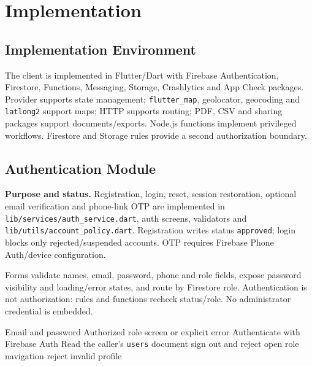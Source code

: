 \chapter{Implementation}\label{ch:implementation}
\section{Implementation Environment}
The client is implemented in Flutter/Dart with Firebase Authentication, Firestore, Functions, Messaging, Storage, Crashlytics and App Check packages. Provider supports state management; \texttt{flutter\_map}, geolocator, geocoding and \texttt{latlong2} support maps; HTTP supports routing; PDF, CSV and sharing packages support documents/exports. Node.js functions implement privileged workflows. Firestore and Storage rules provide a second authorization boundary.

\section{Authentication Module}
\textbf{Purpose and status.} Registration, login, reset, session restoration, optional email verification and phone-link OTP are implemented in \texttt{lib/services/auth\_service.dart}, auth screens, validators and \texttt{lib/utils/account\_policy.dart}. Registration writes status \texttt{approved}; login blocks only rejected/suspended accounts. OTP requires Firebase Phone Auth/device configuration.

Forms validate names, email, password, phone and role fields, expose password visibility and loading/error states, and route by Firestore role. Authentication is not authorization: rules and functions recheck status/role. No administrator credential is embedded.
\begin{algorithm}[H]\caption{Authenticate and route a user}\begin{algorithmic}[1]
\Require Email and password \Ensure Authorized role screen or explicit error
\State Authenticate with Firebase Auth
\State Read the caller's \texttt{users} document
 \State sign out and reject \EndIf
{} \State open role navigation \Else \State reject invalid profile \EndIf
\end{algorithmic}\end{algorithm}

